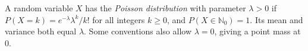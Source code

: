 
A random variable $X$ has the \emph{Poisson distribution} with parameter $\lambda>0$ if $P(X=k)=e^{-\lambda}\lambda^k/k!$ for all integers $k\ge0$, and $P(X\in\mathbb N_0)=1$. Its mean and variance both equal $\lambda$. Some conventions also allow $\lambda=0$, giving a point mass at $0$.
